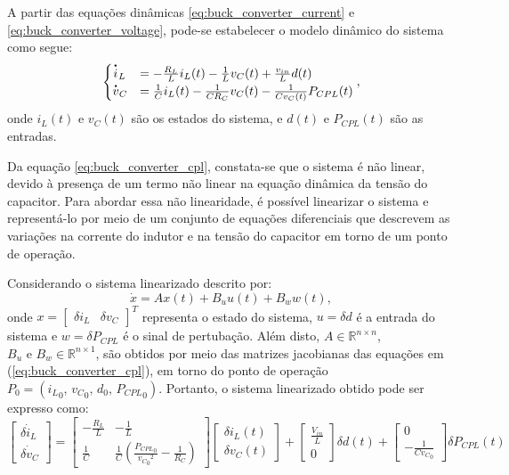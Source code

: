 A partir das equações dinâmicas \eqref{eq:buck_converter_current} e \eqref{eq:buck_converter_voltage}, pode-se estabelecer o modelo dinâmico do sistema como segue: \begin{equation}\begin{cases} \dt{i}_L &=  - \frac{R_L}{L} i_L(t) - \frac{1}{L} v_C(t) + \frac{v_{in}}{L}d(t)  \\ \dt{v}_C &= \frac{1}{C} i_L(t) - \frac{1}{C R_C} v_C(t) - \frac{1}{C v_C(t)} P_{CPL}(t) \label{eq:buck_converter_cpl} \end{cases}, \end{equation} onde $i_L(t)$ e $v_C(t)$ são os estados do sistema, e $d(t)$ e $P_{CPL}(t)$ são as entradas.

Da equação \eqref{eq:buck_converter_cpl}, constata-se que o sistema é não linear, devido à presença de um termo não linear na equação dinâmica da tensão do capacitor. Para abordar essa não linearidade, é possível linearizar o sistema e representá-lo por meio de um conjunto de equações diferenciais que descrevem as variações na corrente do indutor e na tensão do capacitor em torno de um ponto de operação.

Considerando o sistema linearizado descrito por: \begin{equation} \dot{x} = Ax(t) + B_uu(t) + B_ww(t), \end{equation} onde  $x = \begin{bmatrix} \delta i_L & \delta v_C \end{bmatrix} ^ T$ representa o estado do sistema, $u = \delta d$ é a entrada do sistema e $w = \delta P_{CPL}$ é o sinal de pertubação. Além disto, $A \in \mathbb{R}^{n \times n}$, $B_u \text{ e } B_w \in \mathbb{R}^{n \times 1}$, são obtidos por meio das matrizes jacobianas das equações em (\ref{eq:buck_converter_cpl}), em torno do ponto de operação $P_0 = ({i_L}_0, \, {v_C}_0, \, {d}_0, \, {P_{CPL}}_0)$. Portanto, o sistema linearizado obtido pode ser expresso como: \begin{equation} \begin{bmatrix} \dot{\delta i_L} \\ \dot{\delta v_C} \end{bmatrix} = \begin{bmatrix} -\frac{R_L}{L} & -\frac{1}{L}  \\ \frac{1}{C}    & \frac{1}{C}\left(\frac{{P_{CPL}}_0}{{{{v_{C}}_0}^2}} - \frac{1}{R_C}\right) \end{bmatrix} \begin{bmatrix} \delta i_L(t) \\ \delta v_C(t) \end{bmatrix} + \begin{bmatrix} {\frac{V_{in}}{L}} \\ 0 \end{bmatrix} \delta d(t) + \begin{bmatrix} 0 \\ {-\frac{1}{C{v_C}_0}} \end{bmatrix} \delta P_{CPL}(t)\end{equation}


